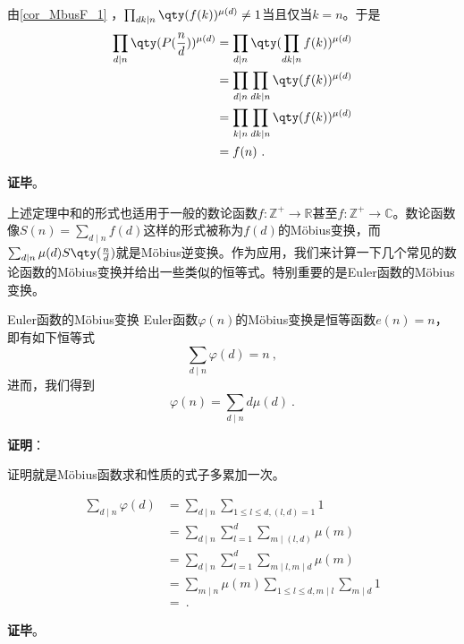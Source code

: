 由\autoref{cor_MbusF_1} ，$\prod_{dk\mid n}\qty(f(k))^{\mu(d)}\neq 1$当且仅当$k=n$。于是
\begin{equation}
\begin{aligned}
\prod_{d\mid n}\qty(P(\frac{n}{d}))^{\mu(d)}&=\prod_{d\mid n}\qty(\prod_{dk\mid n}f(k))^{\mu(d)}\\
&=\prod_{d\mid n}\prod_{dk\mid n}\qty(f(k))^{\mu(d)}\\
&=\prod_{k\mid n}\prod_{dk\mid n}\qty(f(k))^{\mu(d)}\\
&=f(n)~.
\end{aligned}
\end{equation}

\textbf{证毕}。

上述定理中和的形式也适用于一般的数论函数$f:\mathbb{Z}^+\to\mathbb{R}$甚至$f:\mathbb{Z}^+\to\mathbb{C}$。数论函数像$S(n)=\sum_{d\mid n}f(d)$这样的形式被称为$f(d)$的Möbius变换，而$\sum_{d\mid n}\mu(d)S\qty(\frac{n}{d})$就是Möbius逆变换。作为应用，我们来计算一下几个常见的数论函数的Möbius变换并给出一些类似的恒等式。特别重要的是Euler函数的Möbius变换。

\begin{theorem}{Euler函数的Möbius变换}
Euler函数$\varphi(n)$的Möbius变换是恒等函数$e(n)=n$，即有如下恒等式
\begin{equation}
\sum_{d\mid n}\varphi(d) = n~,
\end{equation}
进而，我们得到
\begin{equation}
\varphi(n) = \sum_{d\mid n}d\mu(d)~.
\end{equation}
\end{theorem}

\textbf{证明}：

证明就是Möbius函数求和性质的式子多累加一次。

\begin{equation}
\begin{aligned}
\sum_{d\mid n}\varphi(d)&=\sum_{d\mid n}\sum_{1\leq l\leq d,(l,d)=1}1\\
&=\sum_{d\mid n}\sum_{l=1}^d\sum_{m\mid(l,d)}\mu(m)\\
&=\sum_{d\mid n}\sum_{l=1}^d\sum_{m\mid l,m\mid d}\mu(m)\\
&=\sum_{m\mid n}\mu(m)\sum_{1\leq l\leq d,m\mid l}\sum_{m\mid d}1\\
&=~.
\end{aligned}
\end{equation}

\textbf{证毕}。


